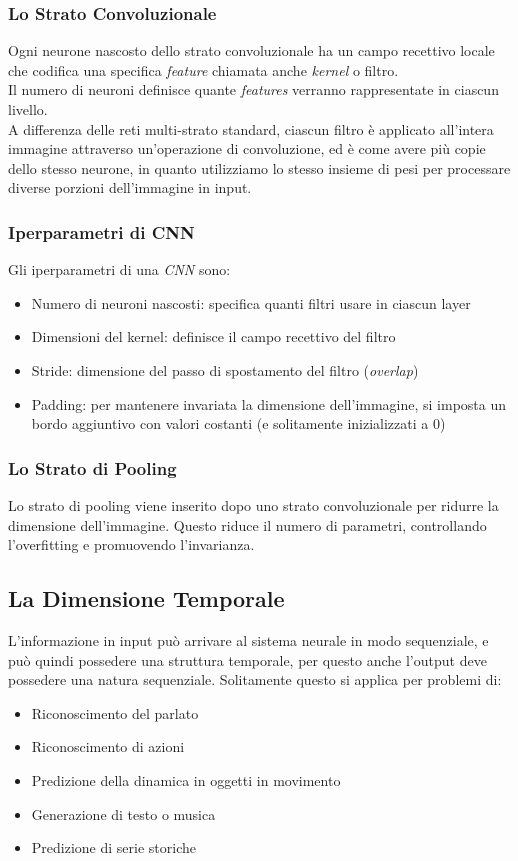 \subsubsection{Lo Strato Convoluzionale}
Ogni neurone nascosto dello strato convoluzionale ha un campo recettivo locale che codifica una specifica \textit{feature} chiamata anche \textit{kernel} o filtro.\\
Il numero di neuroni definisce quante \textit{features} verranno rappresentate in ciascun livello.\\
A differenza delle reti multi-strato standard, ciascun filtro è applicato all'intera immagine attraverso un'operazione di convoluzione, ed è come avere più copie dello stesso neurone, in quanto utilizziamo lo stesso insieme di pesi per processare diverse porzioni dell'immagine in input.
\subsubsection{Iperparametri di CNN}
Gli iperparametri di una \textit{CNN} sono:
\begin{itemize}
    \item Numero di neuroni nascosti: specifica quanti filtri usare in ciascun layer
    \item Dimensioni del kernel: definisce il campo recettivo del filtro
    \item Stride: dimensione del passo di spostamento del filtro (\textit{overlap})
    \item Padding: per mantenere invariata la dimensione dell'immagine, si imposta un bordo aggiuntivo con valori costanti (e solitamente inizializzati a 0)
\end{itemize}

\subsubsection{Lo Strato di Pooling}
Lo strato di pooling viene inserito dopo uno strato convoluzionale per ridurre la dimensione dell'immagine. Questo riduce il numero di parametri, controllando l'overfitting e promuovendo l'invarianza.

\subsection{La Dimensione Temporale}
L'informazione in input può arrivare al sistema neurale in modo sequenziale, e può quindi possedere una struttura temporale, per questo anche l'output deve possedere una natura sequenziale.
Solitamente questo si applica per problemi di:
\begin{itemize}
    \item Riconoscimento del parlato
    \item Riconoscimento di azioni
    \item Predizione della dinamica in oggetti in movimento
    \item Generazione di testo o musica
    \item Predizione di serie storiche
\end{itemize}

